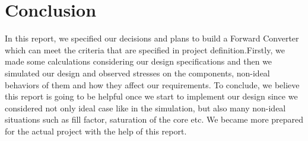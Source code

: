 \documentclass{article}
\newcommand\tab[1][1cm]{\hspace*{#1}}
\begin{document}
\newpage
\section*{Conclusion}
\tab In this report, we specified our decisions and plans to build a Forward Converter which can meet the criteria that are specified in project definition.Firstly, we made some calculations considering our design specifications and then we simulated our design and observed stresses on the components, non-ideal behaviors of them and how they affect our requirements.
\newline\tab To conclude, we believe this report is going to be helpful once we start to implement our design since we considered not only ideal case like in the simulation, but also many non-ideal situations such as fill factor, saturation of the core etc. We became more prepared for the actual project with the help of this report.
\end{document}
